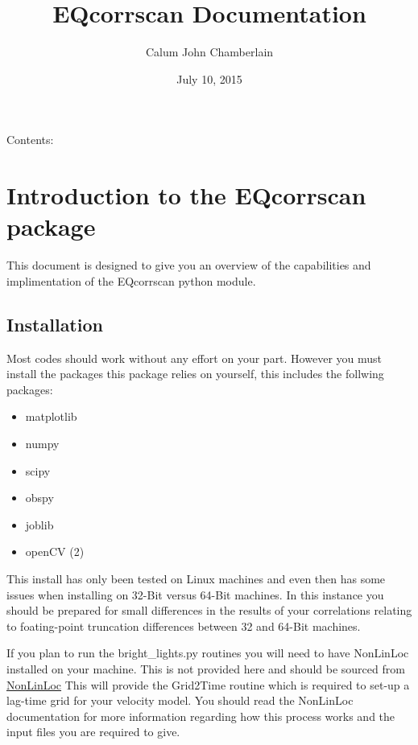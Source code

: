 \documentclass[a4paper,10pt,english]{sphinxmanual}
\title{EQcorrscan Documentation}
\date{July 10, 2015}
\author{Calum John Chamberlain}
\begin{document}
\maketitle
\tableofcontents
{}\label{index::doc}


Contents:


\chapter{Introduction to the EQcorrscan package}
\label{intro::doc}\label{intro:introduction-to-the-eqcorrscan-package}\label{intro:welcome-to-eqcorrscan-s-documentation}
This document is designed to give you an overview of the capabilities and
implimentation of the EQcorrscan python module.


\section{Installation}
\label{intro:installation}
Most codes should work without any effort on your part.  However you must
install the packages this package relies on yourself, this includes the follwing
packages:
\begin{itemize}
\item {} 
matplotlib

\item {} 
numpy

\item {} 
scipy

\item {} 
obspy

\item {} 
joblib

\item {} 
openCV (2)

\end{itemize}

This install has only been tested on Linux machines and even then has some
issues when installing on 32-Bit versus 64-Bit machines.  In this instance you
should be prepared for small differences in the results of your correlations
relating to foating-point truncation differences between 32 and 64-Bit
machines.

If you plan to run the bright\_lights.py routines you will need to have
NonLinLoc installed on your machine.  This is not provided here and should
be sourced from \href{http://alomax.free.fr/nlloc/}{NonLinLoc} This will provide
the Grid2Time routine which is required to set-up a lag-time grid for your
velocity model.  You should read the NonLinLoc documentation for more
information regarding how this process works and the input files you are
required to give.
\end{document}
